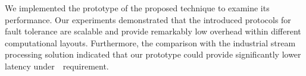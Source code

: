 We implemented the prototype of the proposed technique to examine its performance. Our experiments demonstrated that the introduced protocols for fault tolerance are scalable and provide remarkably low overhead within different computational layouts. Furthermore, the comparison with the industrial stream processing solution indicated that our prototype could provide significantly lower latency under~\eo\ requirement.

